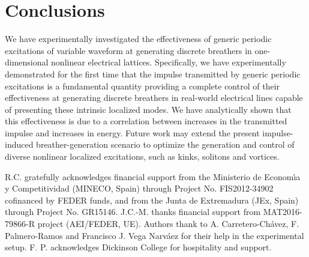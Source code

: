 \documentclass[showpacs,preprintnumbers,10pt,onecolumn]{revtex4}%
\begin{document}
\section{Conclusions} We have experimentally investigated the effectiveness of generic periodic
excitations of variable waveform at generating discrete breathers in
one-dimensional nonlinear electrical lattices. Specifically, we have
experimentally demonstrated for the first time that the impulse transmitted by
generic periodic excitations is a fundamental quantity providing a complete
control of their effectiveness at generating discrete breathers in real-world
electrical lines capable of presenting these intrinsic localized modes. We
have analytically shown that this effectiveness is due to a correlation
between increases in the transmitted impulse and increases in energy. Future
work may extend the present impulse-induced breather-generation scenario to
optimize the generation and control of diverse nonlinear localized
excitations, such as kinks, solitons and vortices.

\begin{acknowledgments}
R.C. gratefully acknowledges financial support from the Ministerio de
Econom\'{\i}a y Competitividad (MINECO, Spain) through Project No.
FIS2012-34902 cofinanced by FEDER funds, and from the Junta de Extremadura
(JEx, Spain) through Project No. GR15146. J.C.-M. thanks financial support from MAT2016-79866-R
project (AEI/FEDER, UE).
Authors thank to A.
Carretero-Ch\'avez, F. Palmero-Ramos and Francisco J. Vega
Narv\'aez for their help in the experimental setup. F. P.
acknowledges Dickinson College for hospitality and support.
\end{acknowledgments}
\end{document}
